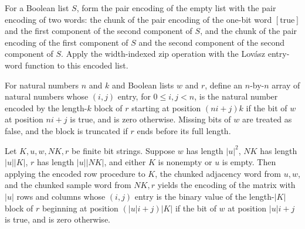 \begin{definition}
\label{Randomized.Matching.lovaszRowW}
\leanok
{}
For a Boolean list $S$, form the pair encoding of the empty list with the pair encoding
of two words: the chunk of the pair encoding of the one-bit word $[\mathrm{true}]$ and
the first component of the second component of $S$, and the chunk of the pair encoding
of the first component of $S$ and the second component of the second component of $S$.
Apply the width-indexed zip operation with the Lovász entry-word function to this
encoded list.
\end{definition}

\begin{definition}
\label{Randomized.Matching.lovaszRows}
\leanok
{}
For natural numbers $n$ and $k$ and Boolean lists $w$ and $r$, define an $n$-by-$n$
array of natural numbers whose $(i,j)$ entry, for $0\le i,j<n$, is the natural number
encoded by the length-$k$ block of $r$ starting at position $(ni+j)k$ if the bit of $w$
at position $ni+j$ is true, and is zero otherwise. Missing bits of $w$ are treated as
false, and the block is truncated if $r$ ends before its full length.
\end{definition}

\begin{theorem}
\label{Randomized.Matching.zipWithW_lovaszRowW}
\leanok
{}
Let $K,u,w,NK,r$ be finite bit strings. Suppose $w$ has length $|u|^2$, $NK$ has length
$|u||K|$, $r$ has length $|u||NK|$, and either $K$ is nonempty or $u$ is empty. Then
applying the encoded row procedure to $K$, the chunked adjacency word from $u,w$, and
the chunked sample word from $NK,r$ yields the encoding of the matrix with $|u|$ rows
and columns whose $(i,j)$ entry is the binary value of the length-$|K|$ block of $r$
beginning at position $(|u|i+j)|K|$ if the bit of $w$ at position $|u|i+j$ is true, and
is zero otherwise.
\end{theorem}

